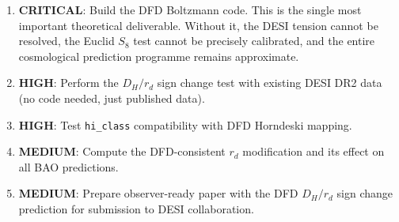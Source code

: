 \documentclass[11pt,a4paper]{article}
\newcommand{\hiclass}{\texttt{hi\_class}}
\begin{document}
\begin{enumerate}
\item \textbf{CRITICAL}: Build the DFD Boltzmann code. This is the
  single most important theoretical deliverable. Without it, the DESI
  tension cannot be resolved, the Euclid $S_8$ test cannot be
  precisely calibrated, and the entire cosmological prediction
  programme remains approximate.

\item \textbf{HIGH}: Perform the $D_H/r_d$ sign change test with
  existing DESI DR2 data (no code needed, just published data).

\item \textbf{HIGH}: Test \hiclass{} compatibility with DFD
  Horndeski mapping.

\item \textbf{MEDIUM}: Compute the DFD-consistent $r_d$ modification
  and its effect on all BAO predictions.

\item \textbf{MEDIUM}: Prepare observer-ready paper with the DFD
  $D_H/r_d$ sign change prediction for submission to DESI collaboration.
\end{enumerate}
\end{document}
